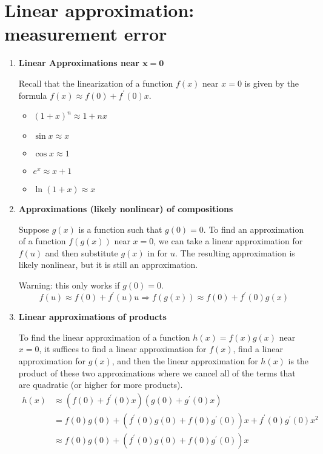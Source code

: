 \section{Linear approximation: measurement error}
\begin{enumerate}
    \item \textbf{Linear Approximations near $\bm{x=0}$}

        Recall that the linearization of a function $f(x)$ near $x=0$ is given by the formula $f(x)\approx f(0)+f^\prime (0)x$.
        \begin{itemize}
            \item $(1+x)^n\approx 1+nx$
            \item $\sin x\approx x$
            \item $\cos x\approx 1$
            \item $e^x\approx x+1$
            \item $\ln(1+x)\approx x$
        \end{itemize}
    \item \textbf{Approximations (likely nonlinear) of compositions}

        Suppose $g(x)$ is a function such that $g(0)=0$. To find an approximation of a function $f(g(x))$ near $x=0$, we can take a linear approximation for $f(u)$ and then substitute $g(x)$ in for $u$. The resulting approximation is likely nonlinear, but it is still an approximation.

        Warning: this only works if $g(0)=0$.
        $$
            f(u)\approx f(0)+f^\prime (u)u\Rightarrow f(g(x))\approx f(0)+f^\prime(0)g(x)
        $$
    \item \textbf{Linear approximations of products}

        To find the linear approximation of a function $h(x)=f(x)g(x)$ near $x=0$, it suffices to find a linear approximation for $f(x)$, find a linear approximation for $g(x)$, and then the linear approximation for $h(x)$ is the product of these two approximations where we cancel all of the terms that are quadratic (or higher for more products).
		\begin{align*}
            h(x) & \approx (f(0)+f^\prime (0)x)(g(0)+g^\prime (0)x) \\
                 & =f(0)g(0)+(f^\prime (0)g(0)+f(0)g^\prime (0))x+f^\prime (0)g^\prime (0)x^2 \\
                 & \approx f(0)g(0)+(f^\prime (0)g(0)+f(0)g^\prime (0))x
        \end{align*}
\end{enumerate}
